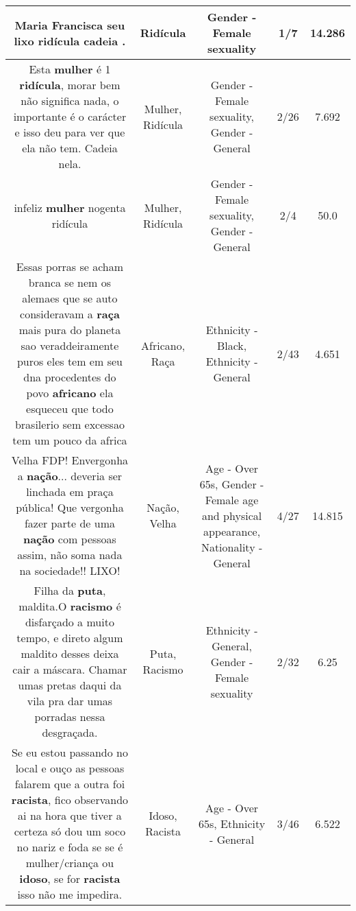 \documentclass[11pt]{article}
\newlength\mylength
\begin{document}
\begin{center}
\begin{longtable}{|C{.65\mylength}|C{.30\mylength}|C{.12\mylength}|C{.12\mylength}|C{.12\mylength}|}
  \small Maria Francisca seu lixo \textbf{ridícula} cadeia .\normalsize   & Ridícula & Gender - Female sexuality & 1/7 & 14.286 \\  \hline
  \small Esta \textbf{mulher} é 1 \textbf{ridícula}, morar bem não significa nada, o importante é o carácter e isso deu para ver que ela não tem. Cadeia nela.\normalsize   & Mulher, Ridícula & Gender - Female sexuality, Gender - General & 2/26 & 7.692 \\  \hline
  \small infeliz \textbf{mulher} nogenta ridícula\normalsize   & Mulher, Ridícula & Gender - Female sexuality, Gender - General & 2/4 & 50.0 \\  \hline
  \small Essas porras se acham branca se nem os alemaes que se auto consideravam a \textbf{raça} mais pura do planeta sao veraddeiramente puros eles tem em seu dna procedentes do povo \textbf{africano} ela esqueceu que todo brasilerio sem excessao tem um pouco da africa\normalsize   & Africano, Raça & Ethnicity - Black, Ethnicity - General & 2/43 & 4.651 \\  \hline
  \small Velha FDP! Envergonha a \textbf{nação}... deveria ser linchada em praça pública! Que vergonha fazer parte de uma \textbf{nação} com pessoas assim, não soma nada na sociedade!! LIXO!\normalsize   & Nação, Velha & Age - Over 65s, Gender - Female age and physical appearance, Nationality - General & 4/27 & 14.815 \\  \hline
  \small Filha da \textbf{puta}, maldita.O \textbf{racismo} é disfarçado a muito tempo, e direto algum maldito desses deixa cair a máscara. Chamar umas pretas daqui da vila pra dar umas porradas nessa desgraçada.\normalsize   & Puta, Racismo & Ethnicity - General, Gender - Female sexuality & 2/32 & 6.25 \\  \hline
  \small Se eu estou passando no local e ouço as pessoas falarem que a outra foi \textbf{racista}, fico observando ai na hora que tiver a certeza só dou um soco no nariz e foda se se é mulher/criança ou \textbf{idoso}, se for \textbf{racista} isso não me impedira.\normalsize   & Idoso, Racista & Age - Over 65s, Ethnicity - General & 3/46 & 6.522 \\  \hline

\end{longtable}
\end{center}
\end{document}
